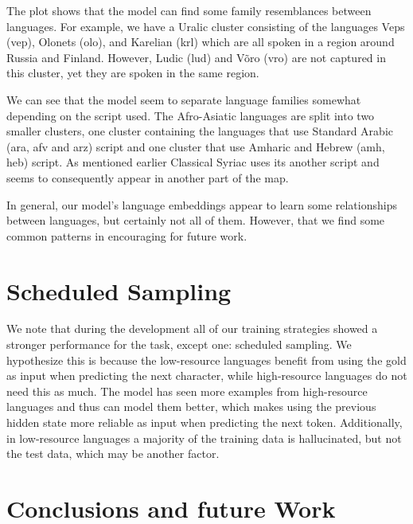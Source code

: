 \documentclass[11pt,a4paper]{article}
\begin{document}
The plot shows that the model can find some family resemblances
between languages. For example, we have a Uralic cluster consisting of
the languages Veps (vep), Olonets (olo), and Karelian (krl) which are
all spoken in a region around Russia and Finland. However, Ludic (lud)
and V\~{o}ro (vro) are not captured in this cluster, yet they are
spoken in the same region.


We can see that the model seem to separate language families somewhat
depending on the script used. The Afro-Asiatic languages are split
into two smaller clusters, one cluster containing the languages that
use Standard Arabic (ara, afv and arz) script and one cluster that use
Amharic and Hebrew (amh, heb) script. As mentioned earlier Classical
Syriac uses its another script and seems to consequently appear in
another part of the map.

In general, our model's language embeddings appear to learn some
relationships between languages, but certainly not all of
them. However, that we find some common patterns in encouraging for
future work.

\section{Scheduled Sampling}

We note that during the development all of our training strategies
showed a stronger performance for the task, except one: scheduled
sampling. 
We hypothesize this is because the low-resource languages
benefit from using the gold as input when predicting the next
character, while high-resource languages do not need this as
much. The model has seen more examples from high-resource languages
and thus can model them better, which makes using the previous
hidden state more reliable as input when predicting the next token.
Additionally, in low-resource languages a majority of the training
data is hallucinated, but not the test data, which may be another
factor.

\section{Conclusions and future Work}
\end{document}
